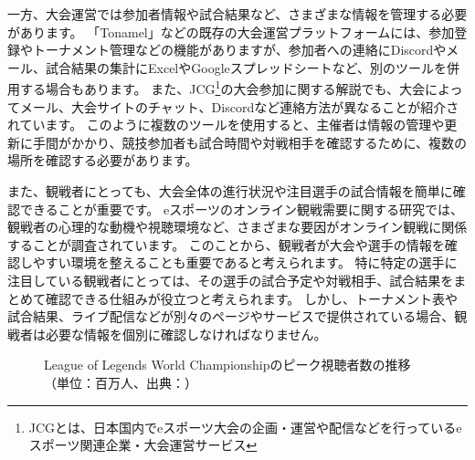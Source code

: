 一方、大会運営では参加者情報や試合結果など、さまざまな情報を管理する必要があります。
「Tonamel」などの既存の大会運営プラットフォームには、参加登録やトーナメント管理などの機能がありますが、参加者への連絡にDiscordやメール、試合結果の集計にExcelやGoogleスプレッドシートなど、別のツールを併用する場合もあります。
また、JCG\footnote{JCGとは、日本国内でeスポーツ大会の企画・運営や配信などを行っているeスポーツ関連企業・大会運営サービス}の大会参加に関する解説でも、大会によってメール、大会サイトのチャット、Discordなど連絡方法が異なることが紹介されています。
このように複数のツールを使用すると、主催者は情報の管理や更新に手間がかかり、競技参加者も試合時間や対戦相手を確認するために、複数の場所を確認する必要があります。

また、観戦者にとっても、大会全体の進行状況や注目選手の試合情報を簡単に確認できることが重要です。
eスポーツのオンライン観戦需要に関する研究では、観戦者の心理的な動機や視聴環境など、さまざまな要因がオンライン観戦に関係することが調査されています。
このことから、観戦者が大会や選手の情報を確認しやすい環境を整えることも重要であると考えられます。
特に特定の選手に注目している観戦者にとっては、その選手の試合予定や対戦相手、試合結果をまとめて確認できる仕組みが役立つと考えられます。
しかし、トーナメント表や試合結果、ライブ配信などが別々のページやサービスで提供されている場合、観戦者は必要な情報を個別に確認しなければなりません。

\begin{figure}[H]
  \centering
  \caption{League of Legends World Championshipのピーク視聴者数の推移（単位：百万人、出典：\cite{escharts2025}）}
  \label{fig:line_trend}
\end{figure}

